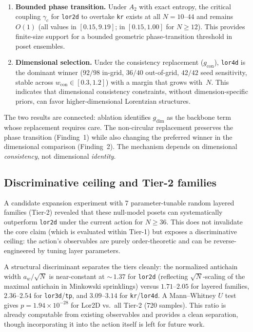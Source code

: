 \documentclass[12pt,a4paper]{article}
\begin{document}
\begin{enumerate}[nosep]
\item \textbf{Bounded phase transition.} Under $A_2$ with exact entropy, the
critical coupling $\gamma_c$ for \texttt{lor2d} to overtake \texttt{kr} exists
at all $N = 10$--$44$ and remains $O(1)$ (all values in $[0.15, 9.19]$; in
$[0.15, 1.00]$ for $N \geq 12$). This provides finite-size support for a
bounded geometric phase-transition threshold in poset ensembles.

\item \textbf{Dimensional selection.} Under the consistency replacement
($g_{\text{con}}$), \texttt{lor4d} is the dominant winner ($92/98$ in-grid,
$36/40$ out-of-grid, $42/42$ seed sensitivity, stable across
$w_{\text{con}} \in [0.3, 1.2]$) with a margin that grows with~$N$.
This indicates that dimensional consistency constraints, without
dimension-specific priors, can favor higher-dimensional Lorentzian
structures.
\end{enumerate}

The two results are connected: ablation identifies $g_{\text{dim}}$ as the
backbone term whose replacement requires care. The non-circular replacement
preserves the phase transition (Finding~1) while also changing the preferred
winner in the dimensional comparison (Finding~2). The mechanism depends on
dimensional \emph{consistency}, not dimensional \emph{identity}.

\subsection{Discriminative ceiling and Tier-2 families}
\label{sec:ceiling}

A candidate expansion experiment with 7 parameter-tunable random layered
families (Tier-2) revealed that these null-model posets can systematically
outperform \texttt{lor2d} under the current action for $N \geq 36$. This does
not invalidate the core claim (which is evaluated within Tier-1) but exposes a
discriminative ceiling: the action's observables are purely order-theoretic and
can be reverse-engineered by tuning layer parameters.

A structural discriminant separates the tiers cleanly: the normalized antichain
width $a_w / \sqrt{N}$ is near-constant at ${\sim}\,1.37$ for \texttt{lor2d}
(reflecting $\sqrt{N}$-scaling of the maximal antichain in Minkowski
sprinklings) versus $1.71\text{--}2.05$ for layered families,
$2.36\text{--}2.54$ for \texttt{lor3d}/\texttt{tp}, and
$3.09\text{--}3.14$ for \texttt{kr}/\texttt{lor4d}.
A Mann--Whitney $U$ test gives $p = 1.94 \times 10^{-28}$ for Lor2D vs.\ all
Tier-2 (720 samples). This ratio is already computable from existing observables
and provides a clean separation, though incorporating it into the action itself
is left for future work.
\end{document}
